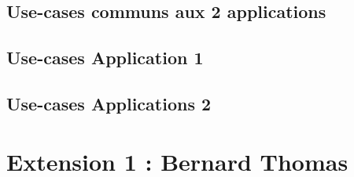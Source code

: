 \documentclass[french, a4paper, 12pt]{article}
\begin{document}
	\subsection{Use-cases communs aux 2 applications}
	
	\subsection{Use-cases Application 1}
	
	\subsection{Use-cases Applications 2}
	
\section{Extension 1 : Bernard Thomas}

	
		

	
\end{document}
